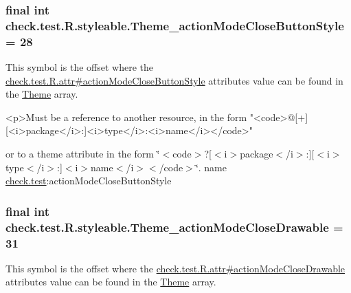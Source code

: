 \subsubsection[{Theme\+\_\+action\+Mode\+Close\+Button\+Style}]{\setlength{\rightskip}{0pt plus 5cm}final int check.\+test.\+R.\+styleable.\+Theme\+\_\+action\+Mode\+Close\+Button\+Style = 28\hspace{0.3cm}{\ttfamily [static]}}\label{classcheck_1_1test_1_1_r_1_1styleable_ab30e73a8022e0a0d45477373a56e8594}
This symbol is the offset where the \hyperlink{classcheck_1_1test_1_1_r_1_1attr_ac21f2ad4b315654a87d0a11cb734236f}{check.\+test.\+R.\+attr\#action\+Mode\+Close\+Button\+Style} attribute\textquotesingle{}s value can be found in the \hyperlink{classcheck_1_1test_1_1_r_1_1styleable_acca726d02016a0cf607782ec3a436a81}{Theme} array.

\begin{DoxyVerb}      <p>Must be a reference to another resource, in the form "<code>@[+][<i>package</i>:]<i>type</i>:<i>name</i></code>"
\end{DoxyVerb}
 or to a theme attribute in the form \char`\"{}$<$code$>$?\mbox{[}$<$i$>$package$<$/i$>$\+:\mbox{]}\mbox{[}$<$i$>$type$<$/i$>$\+:\mbox{]}$<$i$>$name$<$/i$>$$<$/code$>$\char`\"{}.  name \hyperlink{namespacecheck_1_1test}{check.\+test}\+:action\+Mode\+Close\+Button\+Style \hypertarget{classcheck_1_1test_1_1_r_1_1styleable_a4a3a5d915cea1a08a892eb22d86aa5b1}{}
\subsubsection[{Theme\+\_\+action\+Mode\+Close\+Drawable}]{\setlength{\rightskip}{0pt plus 5cm}final int check.\+test.\+R.\+styleable.\+Theme\+\_\+action\+Mode\+Close\+Drawable = 31\hspace{0.3cm}{\ttfamily [static]}}\label{classcheck_1_1test_1_1_r_1_1styleable_a4a3a5d915cea1a08a892eb22d86aa5b1}
This symbol is the offset where the \hyperlink{classcheck_1_1test_1_1_r_1_1attr_a3a9c3f760732e5561dc9790d43141bf7}{check.\+test.\+R.\+attr\#action\+Mode\+Close\+Drawable} attribute\textquotesingle{}s value can be found in the \hyperlink{classcheck_1_1test_1_1_r_1_1styleable_acca726d02016a0cf607782ec3a436a81}{Theme} array.

